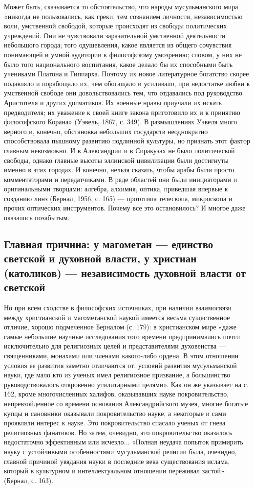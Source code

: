 Может быть, сказывается то обстоятельство, что народы мусульманского
мира «никогда не пользовались, как греки, тем сознанием личности,
независимостью воли, умственной свободой, которые происходят из
свободы политических учреждений. Они не чувствовали заразительной
умственной деятельности небольшого города; того одушевления, какое
является из общего сочувствия понимающей и умной аудитории к
философскому умозрению; словом, у них не было того национального
воспитания, какое делало бы их способными быть учениками Платона и
Гиппарха. Поэтому их новое литературное богатство скорее подавляло и
порабощало их, чем обогащало и усиливало, при недостатке любви к
умственной свободе они довольствовались тем, что отдавались под
руководство Аристотеля и других догматиков. Их военные нравы приучали
их искать предводителя; их уважение к своей книге закона приготовило
их и к принятию философского Корана» (Уэвель, 1867, с. 349). В
размышлениях Уэвеля много верного и, конечно, обстановка небольших
государств неоднократно способствовала пышному развитию подлинной
культуры, но признать этот фактор главным невозможно. И в Александрии
и в Сиракузах не было политической свободы, однако главные высоты
эллинской цивилизации были достигнуты именно в этих городах. И
конечно, нельзя сказать, чтобы арабы были просто комментаторами и
передатчиками. В ряде областей они были инициаторами и оригинальными
творцами: алгебра, алхимия, оптика, приведшая впервые к созданию линз
(Бернал, 1956, с. 165) --- прототипа телескопа, микроскопа и прочих
оптических инструментов. Почему все это остановилось? И многое даже
оказалось позабытым.

\subsection{Главная причина: у магометан --- единство светской и
духовной власти, у христиан (католиков) --- независимость
духовной власти от светской}

Но при всем сходстве в философских источниках, при наличии
взаимосвязи между христианской и магометанской наукой имеется весьма
существенное отличие, хорошо подмеченное Берналом (с. 179): в
христианском мире «даже самые небольшие научные исследования того
времени предпринимались почти исключительно для религиозных целей и
представителями духовенства --- священниками, монахами или членами
какого-либо ордена. В этом отношении условия ее развития заметно
отличаются от. условий развития мусульманской науки, где мало кто из
ученых имел религиозное призвание, а большинство руководствовалось
откровенно утилитарными целями». Как он же указывает на с. 162, кроме
многочисленных халифов, оказывавших науке покровительство,
непревзойденное со времени основания Александрийского музея, многие
богатые купцы и сановники оказывали покровительство науке, а некоторые
и сами проявляли интерес к науке. Это покровительство спасало ученых
от гнева религиозных фанатиков. Но затем, очевидно, это
покровительство оказалось недостаточно эффективным или исчезло...
«Полная неудача попыток примирить науку с устойчивыми особенностями
мусульманской религии была, очевидно, главной причиной увядания науки
в последние века существования ислама, который в культурном и
интеллектуальном отношении переживал застой» (Бернал, с. 163).

